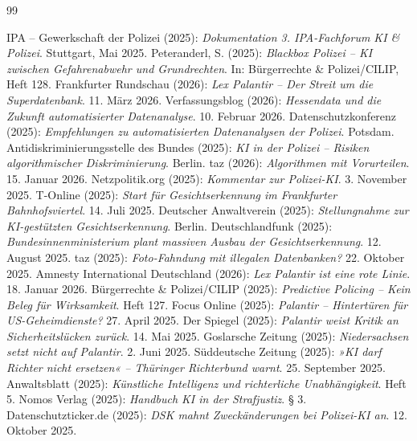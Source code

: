 \documentclass[12pt,a4paper]{article}
\begin{document}
	\newpage
	\begin{thebibliography}{99}
		
		 IPA – Gewerkschaft der Polizei (2025): \emph{Dokumentation 3. IPA-Fachforum KI \& Polizei}. Stuttgart, Mai 2025.
		 Peteranderl, S. (2025): \emph{Blackbox Polizei – KI zwischen Gefahrenabwehr und Grundrechten}. In: Bürgerrechte \& Polizei/CILIP, Heft 128.
		 Frankfurter Rundschau (2026): \emph{Lex Palantir – Der Streit um die Superdatenbank}. 11. März 2026.
		 Verfassungsblog (2026): \emph{Hessendata und die Zukunft automatisierter Datenanalyse}. 10. Februar 2026.
		 Datenschutzkonferenz (2025): \emph{Empfehlungen zu automatisierten Datenanalysen der Polizei}. Potsdam.
		 Antidiskriminierungsstelle des Bundes (2025): \emph{KI in der Polizei – Risiken algorithmischer Diskriminierung}. Berlin.
		 taz (2026): \emph{Algorithmen mit Vorurteilen}. 15. Januar 2026.
		 Netzpolitik.org (2025): \emph{Kommentar zur Polizei-KI}. 3. November 2025.
		 T-Online (2025): \emph{Start für Gesichtserkennung im Frankfurter Bahnhofsviertel}. 14. Juli 2025.
		 Deutscher Anwaltverein (2025): \emph{Stellungnahme zur KI-gestützten Gesichtserkennung}. Berlin.
		 Deutschlandfunk (2025): \emph{Bundesinnenministerium plant massiven Ausbau der Gesichtserkennung}. 12. August 2025.
		 taz (2025): \emph{Foto-Fahndung mit illegalen Datenbanken?} 22. Oktober 2025.
		 Amnesty International Deutschland (2026): \emph{Lex Palantir ist eine rote Linie}. 18. Januar 2026.
		 Bürgerrechte \& Polizei/CILIP (2025): \emph{Predictive Policing – Kein Beleg für Wirksamkeit}. Heft 127.
		 Focus Online (2025): \emph{Palantir – Hintertüren für US-Geheimdienste?} 27. April 2025.
		 Der Spiegel (2025): \emph{Palantir weist Kritik an Sicherheitslücken zurück}. 14. Mai 2025.
		 Goslarsche Zeitung (2025): \emph{Niedersachsen setzt nicht auf Palantir}. 2. Juni 2025.
		 Süddeutsche Zeitung (2025): \emph{»KI darf Richter nicht ersetzen« – Thüringer Richterbund warnt}. 25. September 2025.
		 Anwaltsblatt (2025): \emph{Künstliche Intelligenz und richterliche Unabhängigkeit}. Heft 5.
		 Nomos Verlag (2025): \emph{Handbuch KI in der Strafjustiz}. § 3.
		 Datenschutzticker.de (2025): \emph{DSK mahnt Zweckänderungen bei Polizei-KI an}. 12. Oktober 2025.

\end{thebibliography}
\end{document}
